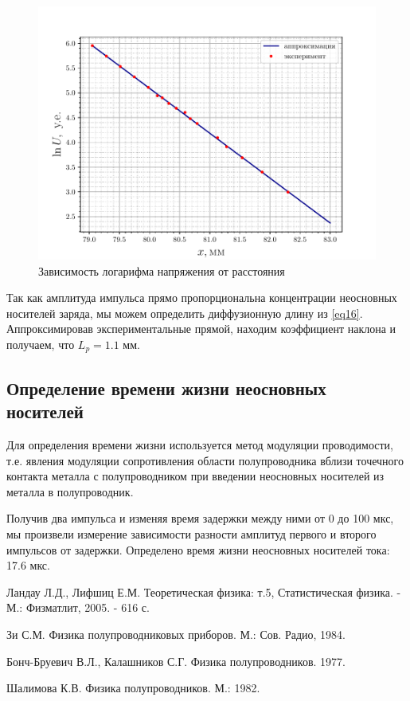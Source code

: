 \begin{figure}[h!]
	\centering
	\includegraphics[width=0.7\linewidth]{fig/1.pdf}
	\caption{Зависимость логарифма напряжения от расстояния}
	\label{fig:1}
\end{figure}
Так как амплитуда импульса прямо пропорциональна концентрации неосновных носителей заряда, мы можем определить диффузионную длину из \eqref{eq16}.
Аппроксимировав экспериментальные прямой, находим коэффициент наклона и получаем, что
$L_p = 1.1 \text{ мм}$. 

\subsection{Определение времени жизни неосновных носителей}
Для определения времени жизни используется метод модуляции проводимости, т.е. явления модуляции сопротивления области полупроводника вблизи точечного контакта металла с полупроводником при введении неосновных носителей из металла в полупроводник.

Получив два импульса и изменяя время задержки между ними от 0 до 100 мкс, мы произвели измерение зависимости разности амплитуд первого и второго импульсов от задержки. Определено время жизни неосновных носителей тока: 17.6 мкс.





\begin{thebibliography}{99}
 Ландау Л.Д., Лифшиц Е.М. Теоретическая физика: т.5, Статистическая физика. - М.: Физматлит, 2005. - 616 с.

 Зи С.М. Физика полупроводниковых приборов. М.: Сов. Радио, 1984.

   Бонч-Бруевич В.Л., Калашников С.Г. Физика полупроводников. 1977.

    Шалимова К.В. Физика полупроводников. М.: 1982.
\end{thebibliography}

